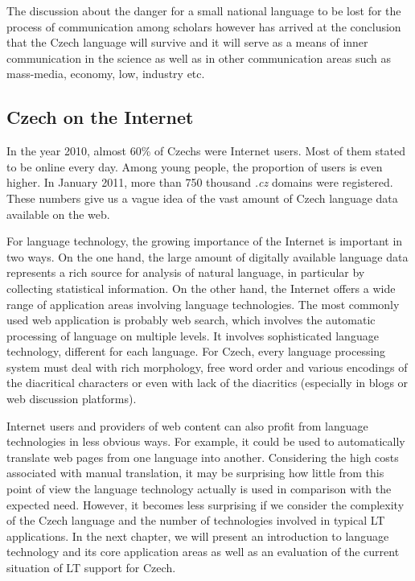 \begin{multicols}{2}
The discussion about the danger for a small national language to be lost for the process of communication among scholars however has arrived at the conclusion that the Czech language will survive and it will serve as a means of inner communication in the science as well as in other communication areas such as mass-media, economy, low, industry etc.
  
\subsection{Czech on the Internet}

In the year 2010, almost 60\% of Czechs were Internet users. Most of them stated to be online every day. Among young people, the proportion of users is even higher. In January 2011, more than 750 thousand \emph{.cz} domains were registered. These numbers give us a vague idea of the vast amount of Czech language data available on the web.

For language technology, the growing importance of the Internet is important in two ways. On the one hand, the large amount of digitally available language data represents a rich source for analysis of natural language, in particular by collecting statistical information. On the other hand, the Internet offers a wide range of application areas involving language technologies.
The most commonly used web application is probably web search, which involves the automatic processing of language on multiple levels. It involves sophisticated language technology, different for each language. For Czech, every language processing system must deal with rich morphology, free word order and various encodings of the diacritical characters or even with lack of the diacritics (especially in blogs or web discussion platforms).

Internet users and providers of web content can also profit from language technologies in less obvious ways. For example, it could be used to automatically translate web pages from one language into another.  Considering the high costs associated with manual translation, it may be surprising how little from this point of view the language technology actually is used in comparison with the expected need. However, it becomes less surprising if we consider the complexity of the Czech language and the number of technologies involved in typical LT applications. In the next chapter, we will present an introduction to language technology and its core application areas as well as an evaluation of the current situation of LT support for Czech.
\end{multicols}
\clearpage

